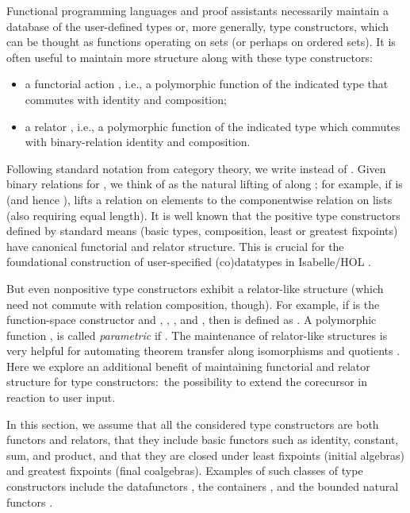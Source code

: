 \documentclass[preprint,draft]
{sigplanconf}
\newcommand{\<}{\langle}
\renewcommand{\>}{\rangle}
\begin{document}
Functional programming languages and proof assistants
necessarily maintain a database of the user-defined
types or, more generally, type constructors, which
can be thought as functions  operating on sets (or perhaps on ordered sets).
It is often useful to maintain more structure along with these type constructors:
\begin{itemize}
\item a functorial action , i.e., a polymorphic function
of the indicated type that commutes with identity  and composition;
\item a relator , i.e.,
a polymorphic function of the indicated type which commutes with binary-relation identity and composition.
\end{itemize}
Following standard notation from category theory, we write  instead of .
Given binary relations  for , we
think of  as the natural
lifting of  along ; for example, if  is  (and hence ),
 lifts a relation on elements to the componentwise relation on lists (also requiring equal length). It is well known that the positive type constructors defined by standard means (basic types, composition, least or greatest fixpoints)
have canonical functorial and relator structure. This is crucial
for the foundational construction of user-specified (co)datatypes in Isabelle\slash HOL  \cite{traytel-et-al-2012}.

But even nonpositive type constructors 
exhibit a relator-like structure  (which
need not commute with relation composition, though).
For example, if  is the function-space constructor  and
, ,
, and ,
then  is defined as .
A polymorphic function ,  is called {\em parametric} \cite{rey-param,wadler-89}
if .
The maintenance of relator-like structures is very helpful for automating theorem transfer along isomorphisms and quotients
\cite{huffman-lifting}.
Here we explore an additional benefit of maintaining functorial and relator structure for type constructors:\
the possibility to extend the corecursor in reaction to user input.

In this section, we assume that all the considered type constructors are both functors and relators,
that they include
basic functors such as identity, constant, sum, and product, and that they are closed under
least fixpoints (initial algebras) and greatest fixpoints (final coalgebras).
Examples of such classes of type constructors include the datafunctors \cite{hensel-interatedRecursion}, the containers \cite{abbott-et-al-2005},
and the bounded natural functors \cite{traytel-et-al-2012}. 
\end{document}
